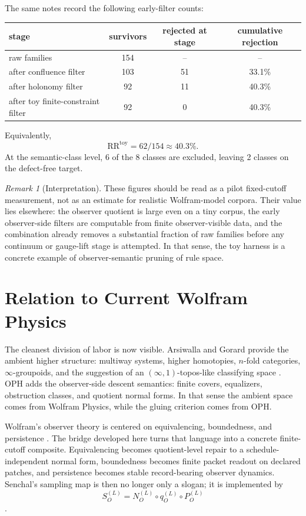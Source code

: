 \documentclass[11pt]{article}
\theoremstyle{remark}
\newtheorem{remark}[theorem]{Remark}
\theoremstyle{plain}
\begin{document}
The same notes record the following early-filter counts:

\begin{center}
\begin{tabular}{@{}lccc@{}}
\toprule
stage & survivors & rejected at stage & cumulative rejection \\
\midrule
raw families & 154 & -- & -- \\
after confluence filter & 103 & 51 & 33.1\% \\
after holonomy filter & 92 & 11 & 40.3\% \\
after toy finite-constraint filter & 92 & 0 & 40.3\% \\
\bottomrule
\end{tabular}
\end{center}

Equivalently,
\[
\mathrm{RR}^{\mathrm{toy}}=62/154\approx 40.3\%.
\]
At the semantic-class level, 6 of the 8 classes are excluded, leaving 2 classes on the defect-free target.

\begin{remark}[Interpretation]
These figures should be read as a pilot fixed-cutoff measurement, not as an estimate for realistic Wolfram-model corpora. Their value lies elsewhere: the observer quotient is large even on a tiny corpus, the early observer-side filters are computable from finite observer-visible data, and the combination already removes a substantial fraction of raw families before any continuum or gauge-lift stage is attempted. In that sense, the toy harness is a concrete example of observer-semantic pruning of rule space.
\end{remark}

\section{Relation to Current Wolfram Physics}
\label{sec:relation}

The cleanest division of labor is now visible. Arsiwalla and Gorard provide the ambient higher structure: multiway systems, higher homotopies, \(n\)-fold categories, \(\infty\)-groupoids, and the suggestion of an \((\infty,1)\)-topos-like classifying space \cite{arsiwalla2021nfold,arsiwalla2021pregeometric}. OPH adds the observer-side descent semantics: finite covers, equalizers, obstruction classes, and quotient normal forms. In that sense the ambient space comes from Wolfram Physics, while the gluing criterion comes from OPH.

Wolfram's observer theory is centered on equivalencing, boundedness, and persistence \cite{wolfram2023observer}. The bridge developed here turns that language into a concrete finite-cutoff composite. Equivalencing becomes quotient-level repair to a schedule-independent normal form, boundedness becomes finite packet readout on declared patches, and persistence becomes stable record-bearing observer dynamics. Senchal's sampling map is then no longer only a slogan; it is implemented by
\[
S_O^{(L)}=N_O^{(L)}\circ q_O^{(L)}\circ P_O^{(L)}
\]
\cite{senchal2025}.
\end{document}
